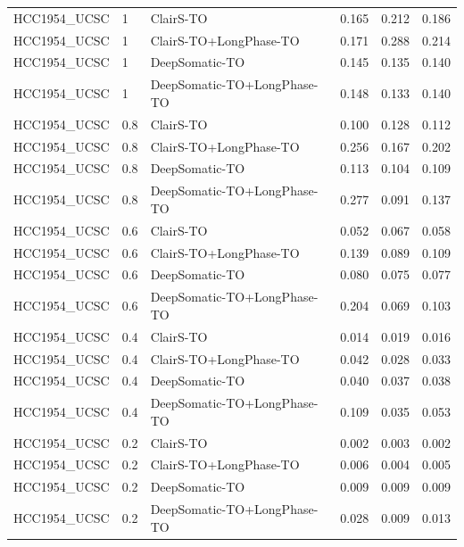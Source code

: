 \documentclass[pdflatex,sn-nature]{sn-jnl}
\begin{document}
{\begin{longtable}{@{}lllccc@{}}
  HCC1954\_UCSC & 1 & ClairS-TO & 0.165 & 0.212 & 0.186 \\
  HCC1954\_UCSC & 1 & ClairS-TO+LongPhase-TO & 0.171 & 0.288 & 0.214 \\
  HCC1954\_UCSC & 1 & DeepSomatic-TO & 0.145 & 0.135 & 0.140 \\
  HCC1954\_UCSC & 1 & DeepSomatic-TO+LongPhase-TO & 0.148 & 0.133 & 0.140 \\
  HCC1954\_UCSC & 0.8 & ClairS-TO & 0.100 & 0.128 & 0.112 \\
  HCC1954\_UCSC & 0.8 & ClairS-TO+LongPhase-TO & 0.256 & 0.167 & 0.202 \\
  HCC1954\_UCSC & 0.8 & DeepSomatic-TO & 0.113 & 0.104 & 0.109 \\
  HCC1954\_UCSC & 0.8 & DeepSomatic-TO+LongPhase-TO & 0.277 & 0.091 & 0.137 \\
  HCC1954\_UCSC & 0.6 & ClairS-TO & 0.052 & 0.067 & 0.058 \\
  HCC1954\_UCSC & 0.6 & ClairS-TO+LongPhase-TO & 0.139 & 0.089 & 0.109 \\
  HCC1954\_UCSC & 0.6 & DeepSomatic-TO & 0.080 & 0.075 & 0.077 \\
  HCC1954\_UCSC & 0.6 & DeepSomatic-TO+LongPhase-TO & 0.204 & 0.069 & 0.103 \\
  HCC1954\_UCSC & 0.4 & ClairS-TO & 0.014 & 0.019 & 0.016 \\
  HCC1954\_UCSC & 0.4 & ClairS-TO+LongPhase-TO & 0.042 & 0.028 & 0.033 \\
  HCC1954\_UCSC & 0.4 & DeepSomatic-TO & 0.040 & 0.037 & 0.038 \\
  HCC1954\_UCSC & 0.4 & DeepSomatic-TO+LongPhase-TO & 0.109 & 0.035 & 0.053 \\
  HCC1954\_UCSC & 0.2 & ClairS-TO & 0.002 & 0.003 & 0.002 \\
  HCC1954\_UCSC & 0.2 & ClairS-TO+LongPhase-TO & 0.006 & 0.004 & 0.005 \\
  HCC1954\_UCSC & 0.2 & DeepSomatic-TO & 0.009 & 0.009 & 0.009 \\
  HCC1954\_UCSC & 0.2 & DeepSomatic-TO+LongPhase-TO & 0.028 & 0.009 & 0.013 \\
\end{longtable}
}
\end{document}
